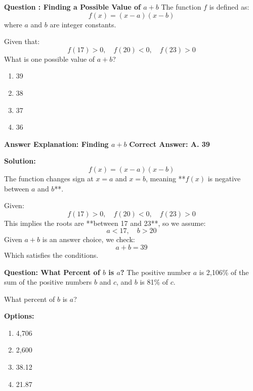 \documentclass{beamer}
\begin{document}
\begin{frame}{\textbf{Question : Finding a Possible Value of \( a + b \)}}
    The function \( f \) is defined as:
    \[
    f(x) = (x - a)(x - b)
    \]
    where \( a \) and \( b \) are integer constants.  

    \vspace{0.3cm}
    Given that:
    \[
    f(17) > 0, \quad f(20) < 0, \quad f(23) > 0
    \]
    What is one possible value of \( a + b \)?

    \vspace{0.5cm}
    \begin{enumerate}
        \item[A.] 39
        \item[B.] 38
        \item[C.] 37
        \item[D.] 36
    \end{enumerate}
\end{frame}

\begin{frame}{\textbf{Answer Explanation: Finding \( a + b \)}}
    \textbf{Correct Answer: \textcolor{novelPurple}{A. 39}}  

    \vspace{0.3cm}
    \textbf{Solution:}
    \[
    f(x) = (x - a)(x - b)
    \]
    The function changes sign at \( x = a \) and \( x = b \), meaning **\( f(x) \) is negative between \( a \) and \( b \)**.

    \vspace{0.3cm}
    Given:
    \[
    f(17) > 0, \quad f(20) < 0, \quad f(23) > 0
    \]
    This implies the roots are **between 17 and 23**, so we assume:
    \[
    a < 17, \quad b > 20
    \]
    Given \( a + b \) is an answer choice, we check:
    \[
    a + b = 39
    \]
    Which satisfies the conditions.  
\end{frame}

\begin{frame}{\textbf{Question: What Percent of \( b \) is \( a \)?}}
    The positive number \( a \) is 2,106\% of the sum of the positive numbers \( b \) and \( c \),  
    and \( b \) is 81\% of \( c \).  

    \vspace{0.3cm}
    What percent of \( b \) is \( a \)?

    \vspace{0.5cm}
    \textbf{Options:}
    \begin{enumerate}
        \item[A.] 4,706%
        \item[B.] 2,600%
        \item[C.] 38.12%
        \item[D.] 21.87%
    \end{enumerate}
\end{frame}
\end{document}
